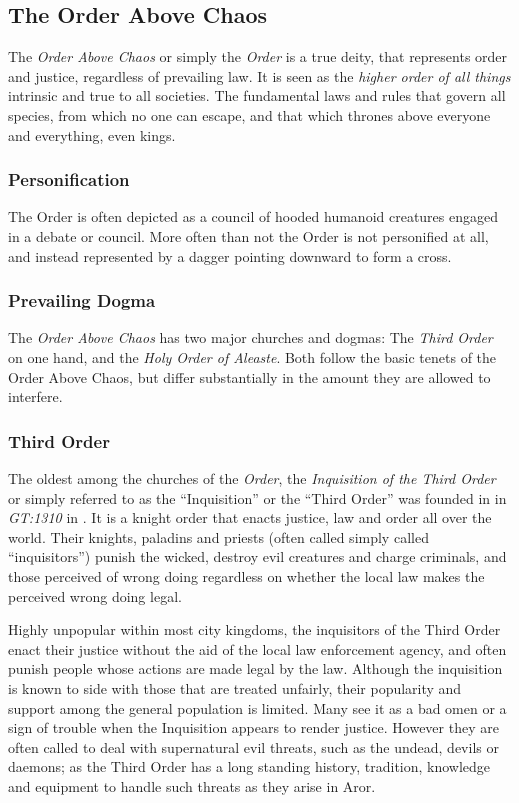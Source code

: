 \subsection{The Order Above Chaos}

The \emph{Order Above Chaos} or simply the \emph{Order} is a true deity, that
represents order and justice, regardless of prevailing law. It is seen as the
\emph{higher order of all things} intrinsic and true to all societies. The
fundamental laws and rules that govern all species, from which no one can
escape, and that which thrones above everyone and everything, even kings.

\subsubsection{Personification}

The Order is often depicted as a council of hooded humanoid creatures engaged
in a debate or council. More often than not the Order is not personified at
all, and instead represented by a dagger pointing downward to form a cross.

\subsubsection{Prevailing Dogma}

The \emph{Order Above Chaos} has two major churches and dogmas: The
\emph{Third Order} on one hand, and the \emph{Holy Order of Aleaste}. Both
follow the basic tenets of the Order Above Chaos, but differ substantially in
the amount they are allowed to interfere.

\subsubsection{Third Order}
\label{sec:Third Order}

The oldest among the churches of the \emph{Order}, the \emph{Inquisition of
  the Third Order} or simply referred to as the ``Inquisition'' or the
``Third Order'' was founded in in \emph{GT:1310} in . It
is a knight order that enacts justice, law and order all over the world. Their
knights, paladins and priests (often called simply called ``inquisitors'')
punish the wicked, destroy evil creatures and charge criminals, and those
perceived of wrong doing regardless on whether the local law makes the
perceived wrong doing legal.

Highly unpopular within most city kingdoms, the inquisitors of the Third Order
enact their justice without the aid of the local law enforcement agency, and
often punish people whose actions are made legal by the law. Although the
inquisition is known to side with those that are treated unfairly, their
popularity and support among the general population is limited. Many see it
as a bad omen or a sign of trouble when the Inquisition appears to render
justice. However they are often called to deal with supernatural evil threats,
such as the undead, devils or daemons; as the Third Order has a long standing
history, tradition, knowledge and equipment to handle such threats as they
arise in Aror.

